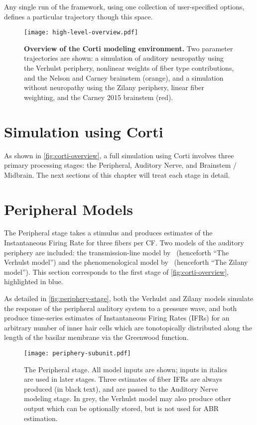 Any single run of the framework, using one collection of user-specified options, defines a particular trajectory though this space.

\begin{figure}[htbp]
	\centering
	\texttt{[image: high-level-overview.pdf]}
	\caption[Overview of the Corti Modeling Environment.]{\textbf{Overview of the Corti modeling environment.} Two parameter trajectories are shown: a simulation of auditory neuropathy using the Verhulst periphery, nonlinear weights of fiber type contributions, and the Nelson and Carney brainstem (orange), and a simulation without neuropathy using the Zilany periphery, linear fiber weighting, and the Carney 2015 brainstem (red).}
	\label{fig:corti-overview}
	\end{figure}

\section{Simulation using Corti} %
\label{sec:simulation_using_corti}
As shown in \autoref{fig:corti-overview}, a full simulation using Corti involves three primary processing stages: the Peripheral, Auditory Nerve, and Brainstem / Midbrain. The next sections of this chapter will treat each stage in detail. 

\section{Peripheral Models} %
\label{sec:peripheral_models}
The Peripheral stage takes a stimulus and produces estimates of the Instantaneous Firing Rate for three fibers per CF.  Two models of the auditory periphery are included: the transmission-line model by~\cite{Verhulst2015Functional} (henceforth ``The Verhulst model'') and the phenomenological model by~\cite{Zilany2014Updated} (henceforth ``The Zilany model'').  This section corresponds to the first stage of \autoref{fig:corti-overview}, highlighted in blue.

As detailed in \autoref{fig:periphery-stage}, both the Verhulst and Zilany models simulate the response of the peripheral auditory system to a pressure wave, and both produce time-series estimates of Instantaneous Firing Rates (IFRs) for an arbitrary number of inner hair cells which are tonotopically distributed along the length of the basilar membrane via the Greenwood function.

\begin{figure}[htbp]
	\centering
	\texttt{[image: periphery-subunit.pdf]}
	\caption[The Peripheral Stage]{The Peripheral stage. All model inputs are shown; inputs in italics are used in later stages.  Three estimates of fiber IFRs are always produced (in black text), and are passed to the Auditory Nerve modeling stage.  In grey, the Verhulst model may also produce other output which can be optionally stored, but is not used for ABR estimation. }
	\label{fig:periphery-stage}
\end{figure}

